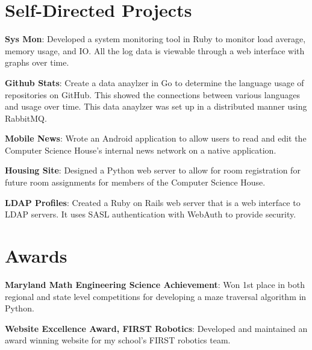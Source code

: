 \documentclass[a4paper,margin,line]{resume}
\begin{document}
\begin{resume}
\section{\mysidestyle Self-Directed Projects}
    \begin{asparablank}
        \item \textbf{Sys Mon}: Developed a system monitoring tool in Ruby to monitor 
            load average, memory usage, and IO. All the log 
            data is viewable through a web interface with graphs over time.
        \\
        \item \textbf{Github Stats}: Create a data anaylzer in Go to determine the language
            usage of repositories on GitHub. This showed the connections between
            various languages and usage over time. This data anaylzer was set up in a
            distributed manner using RabbitMQ.
        \\
        \item \textbf{Mobile News}: Wrote an Android application to allow users to read 
            and edit the Computer Science House’s internal news network on a 
            native application.
        \\
        \item \textbf{Housing Site}: Designed a Python web server to allow for room 
            registration for future room assignments for members of the Computer
            Science House.
        \\
        \item \textbf{LDAP Profiles}: Created a Ruby on Rails web server that is a web 
            interface to LDAP servers. It uses SASL authentication with WebAuth 
            to provide security.
    \end{asparablank}
\section{\mysidestyle Awards}
    \begin{asparablank}
        \item \textbf{Maryland Math Engineering Science Achievement}: Won 1st place
            in both regional and state level competitions for developing a maze
            traversal algorithm in Python.
        \\
        \item \textbf{Website Excellence Award, FIRST Robotics}: Developed and maintained an
            award winning website for my school's FIRST robotics team.
    \end{asparablank}

\end{resume}
\end{document}
